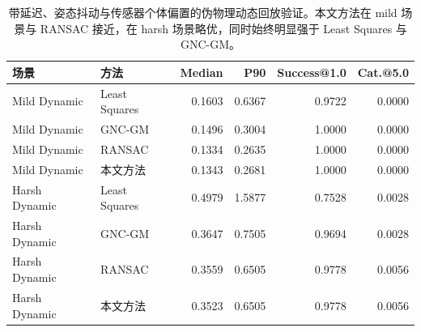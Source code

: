\begin{table}[!htbp]
\centering
\caption{带延迟、姿态抖动与传感器个体偏置的伪物理动态回放验证。本文方法在 mild 场景与 RANSAC 接近，在 harsh 场景略优，同时始终明显强于 Least Squares 与 GNC-GM。}
\label{tab:pseudophysical}
\begin{tabular}{llrrrr}
\toprule
场景 & 方法 & Median & P90 & Success@1.0 & Cat.@5.0 \\
\midrule
Mild Dynamic  & Least Squares & 0.1603 & 0.6367 & 0.9722 & 0.0000 \\
Mild Dynamic  & GNC-GM        & 0.1496 & 0.3004 & 1.0000 & 0.0000 \\
Mild Dynamic  & RANSAC        & 0.1334 & 0.2635 & 1.0000 & 0.0000 \\
Mild Dynamic  & 本文方法       & 0.1343 & 0.2681 & 1.0000 & 0.0000 \\
\midrule
Harsh Dynamic & Least Squares & 0.4979 & 1.5877 & 0.7528 & 0.0028 \\
Harsh Dynamic & GNC-GM        & 0.3647 & 0.7505 & 0.9694 & 0.0028 \\
Harsh Dynamic & RANSAC        & 0.3559 & 0.6505 & 0.9778 & 0.0056 \\
Harsh Dynamic & 本文方法       & 0.3523 & 0.6505 & 0.9778 & 0.0056 \\
\bottomrule
\end{tabular}
\end{table}

